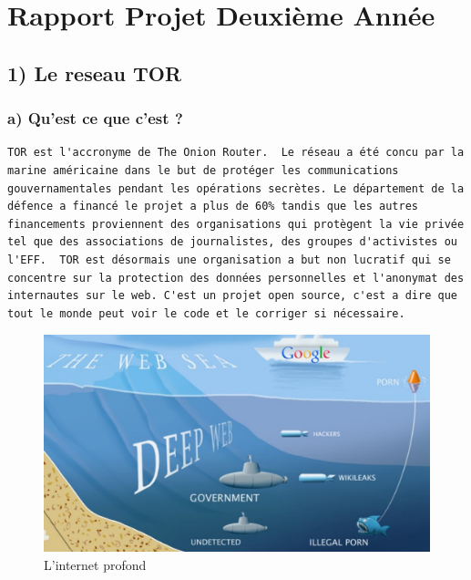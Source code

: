\documentclass[]{article}
\date{}
\begin{document}
\section{Rapport Projet Deuxième
Année}\label{rapport-projet-deuxiuxe8me-annuxe9e}

\subsection{1) Le reseau TOR}\label{le-reseau-tor}

\subsubsection{a) Qu'est ce que c'est ?}\label{a-quest-ce-que-cest}

\begin{verbatim}
TOR est l'accronyme de The Onion Router.  Le réseau a été concu par la marine américaine dans le but de protéger les communications gouvernamentales pendant les opérations secrètes. Le département de la défence a financé le projet a plus de 60% tandis que les autres financements proviennent des organisations qui protègent la vie privée tel que des associations de journalistes, des groupes d'activistes ou l'EFF.  TOR est désormais une organisation a but non lucratif qui se concentre sur la protection des données personnelles et l'anonymat des internautes sur le web. C'est un projet open source, c'est a dire que tout le monde peut voir le code et le corriger si nécessaire.
\end{verbatim}

\begin{figure}
\centering
\includegraphics{./tex2pdf.4104/6d479c0a3a7130cebbf480e114702b120ce3f3bb.jpg}
\caption{L'internet profond}
\end{figure}
\end{document}

